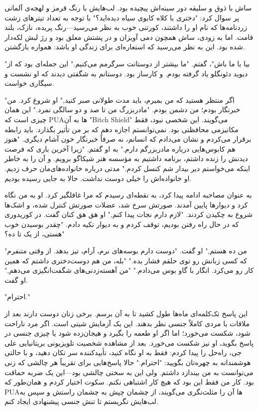 

ساش با ذوق و سلیقه دور سینه‌اش پیچیده بود. لب‌هایش با رنگ قرمز و لهجه‌ی آلمانی پر سوال کرد: "دختری با کلاه کابوی سیاه دیده‌اید؟" با توجه به تعداد تیترهای زشت زردنامه‌ها که نام او را داشتند، کورتنی خوب به نظر می‌رسید—رنگ پریده، نازک، بلند قامت. اما به زودی، ساش همچون دمی آویزان و در پشتش معلق بود و رژ لبش لکه‌دار شده بود. این به نظر می‌رسید که استعاره‌ای برای زندگی او باشد: همواره بازگشتن.

"بیا با ما باش"، گفتم. "ما بیشتر از دوستانت سرگرمم می‌کنیم." این جمله‌ای بود که از دیوید دئونگلو یاد گرفته بودم. و کارساز بود. دوستانم به شگفتی دیدند که او نشست و سیگاری خواست.

"اگر منتظر هستید که من بمیرم، باید مدت طولانی صبر کنید," او شروع کرد. من خبرنگار بودم؛ من دشمن بودم. "مادربزرگ من تا صد و دو سالگی نمرد." این همان چیزی است که PUAها به آن "Bitch Shield" می‌گویند. این شخصی نبود، فقط مکانیزمی محافظتی بود. نمی‌توانستم اجازه دهم که بر من تأثیر بگذارد. باید رابطه برقرار می‌کردم و نشان می‌دادم که انسانم، نه صرفاً خبرنگار خون آشام دیگری. "هنوز هم کابوس‌هایی درباره مادربزرگم دارم," به او گفتم, "زیرا آخرین باری که فرصت دیدنش را زنده داشتم، برنامه داشتیم به مؤسسه هنر شیکاگو برویم. و آن را به خاطر اینکه می‌خواستم دیر بیدار شم کنسل کردم." مدتی درباره خانواده‌های‌مان حرف زدیم. او خانواده‌اش را خیلی دوست نداشت. حالا به جایی رسیده بودیم.

به عنوان مصاحبه ادامه پیدا کرد، به نقطه‌ای رسیدم که مرا غافلگیر کرد. او به من نگاه کرد و دیوارها پایین آمدند. صورتش سرخ شد، عضلات صورتش کنترل شده، و اشک‌ها شروع به چکیدن کردند. "لازم دارم نجات پیدا کنم," او هق هق کنان گفت. در کوریدوری که در حال راه رفتن بودیم، توقف کردم و به دیوار تکیه دادم. "چقدر بوسیدن خوب هستی، از یک تا ده؟"

"من ده هستم," او گفت. "دوست دارم بوسه‌های نرم، آرام، تیز بدهد. از وقتی متنفرم که کسی زبانش رو توی حلقم فشار بده." "بله، من هم دوست‌دختری داشتم که همین کار رو می‌کرد. انگار با گاو بوس می‌دادم." "من آهسته‌زدنی‌های شگفت‌انگیزی می‌دهم," او گفت.

"احترام."

این پاسخ تک‌کلمه‌ای ماه‌ها طول کشید تا به آن برسم. برخی زنان دوست دارند بعد از ملاقات با مردی کاملاً جنسی نظر بدهند. این یک آزمایش شیتی است. اگر مرد ناراحت شود، شکست می‌خورد؛ اما اگر او طعمه را بگیرد و هیجان‌زده شود یا چیزی جنسی در پاسخ بگوید، او نیز شکست می‌خورد. بعد از مشاهده شخصیت تلویزیونی بریتانیایی علی جی، راه‌حل را پیدا کردم: فقط به او نگاه کنید، تأیید‌کننده سر تکان دهید، و با حالتی هوشمندانه به چهره‌تان بگویید: "احترام." حالا پاسخ‌هایی برای تقریباً هر چالشی که زنی می‌توانست به من بیندازد داشتم. ولی این به سختی چالشی بود—این یک ضربه حماقت بود. کار من فقط این بود که هیچ کار اشتباهی نکنم. سکوت اختیار کردم و همان‌طور که PUAها آن را مثلث‌نگری می‌گویند، از چشمان چپش به چشمان راستش و سپس به لب‌هایش نگریستم تا تنش جنسی پیشنهادی ایجاد کنم.


